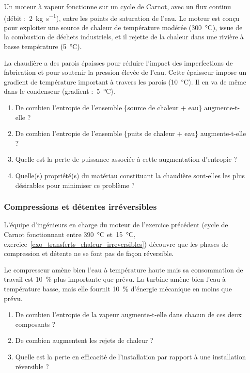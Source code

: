	Un moteur à vapeur fonctionne sur un cycle de Carnot, avec un flux continu (débit :~\SI{2}{\kilogram\per\second}), entre les points de saturation de l’eau. Le moteur est conçu pour exploiter une source de chaleur de température modérée (\SI{300}{\degreeCelsius}), issue de la combustion de déchets industriels, et il rejette de la chaleur dans une rivière à basse température (\SI{5}{\degreeCelsius}).

	La chaudière a des parois épaisses pour réduire l’impact des imperfections de fabrication et pour soutenir la pression élevée de l’eau. Cette épaisseur impose un gradient de température important à travers les parois (\SI{10}{\degreeCelsius}). Il en va de même dans le condenseur (gradient :~\SI{5}{\degreeCelsius}).

	\begin{enumerate}
		\item De combien l’entropie de l’ensemble \{source de chaleur + eau\} augmente-t-elle ?
		\item De combien l’entropie de l’ensemble \{puits de chaleur + eau\} augmente-t-elle ?
		\item Quelle est la perte de puissance associée à cette augmentation d’entropie ?
		\item Quelle(s) propriété(s) du matériau constituant la chaudière sont-elles les plus désirables pour minimiser ce problème ?
	\end{enumerate}


\subsubsection{Compressions et détentes irréversibles}
\label{exo_compressions_detentes_irreversibles}

	L’équipe d’ingénieurs en charge du moteur de l’exercice précédent (cycle de Carnot fonctionnant entre \SI{390}{\degreeCelsius} et~\SI{15}{\degreeCelsius}, exercice~\ref{exo_transferts_chaleur_irreversibles}) découvre que les phases de compression et détente ne se font pas de façon réversible.

	Le compresseur amène bien l’eau à température haute mais sa consommation de travail est \SI{10}{\percent} plus importante que prévu. La turbine amène bien l’eau à température basse, mais elle fournit \SI{10}{\percent} d’énergie mécanique en moins que prévu.
	
	\begin{enumerate}
		\item De combien l’entropie de la vapeur augmente-t-elle dans chacun de ces deux composants ?
		\item De combien augmentent les rejets de chaleur ?
		\item Quelle est la perte en efficacité de l’installation par rapport à une installation réversible ?
	\end{enumerate}


